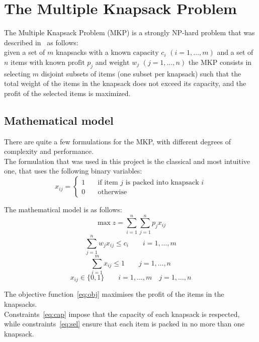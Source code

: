 \chapter{The Multiple Knapsack Problem}
The Multiple Knapsack Problem (MKP) is a strongly NP-hard problem that was described in~\cite{mkp:2019} as follows:\\
given a set of \(m\) knapsacks with a known \(\text{capacity } c_{i}\) \((i=1,\dots,m)\) and a set of \(n\) items with
known \(\text{profit } p_{j}\) and \(\text{weight } w_{j}\) \((j=1,\dots,n)\) the MKP consists in
selecting \(m\) disjoint subsets of items (one subset per knapsack) such that the total weight of the items in the knapsack
does not exceed its capacity, and the profit of the selected items is maximized.

\section{Mathematical model}
There are quite a few formulations for the MKP, with different degrees of
complexity and performance.\\
The formulation that was used in this project is the classical and most intuitive
one, that uses the following binary variables:
\[x_{ij}=
\begin{cases}
    1 & \quad \text{if item } j \text{ is packed into knapsack } i\\
    0 & \quad \text{otherwise}
\end{cases}
\]

The mathematical model is as follows:
\begin{equation}
    \label{eq:obj}
    \max{z} = \sum_{i=1}^{n} \sum_{j=1}^{n} p_{j} x_{ij}
\end{equation}
\begin{equation}
    \label{eq:cap}
    \sum_{j=1}^{n} w_{j} x_{ij} \leq c_{i} \qquad i=1,\dots,m
\end{equation}
\begin{equation}
    \label{eq:sel}
    \sum_{i=1}^{m} x_{ij} \leq 1 \qquad j=1,\dots,n
\end{equation}
\begin{equation}
    x_{ij} \in \{0,1\} \qquad i=1,\dots,m \quad j=1,\dots,n
\end{equation}

The objective function~\eqref{eq:obj} maximises the profit of the items in the knapsacks.\\
Constraints~\eqref{eq:cap} impose that the capacity of each knapsack is respected, while constraints~\eqref{eq:sel}
ensure that each item is packed in no more than one knapsack.

